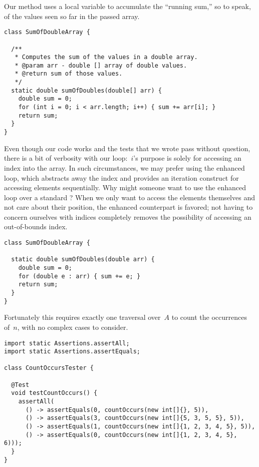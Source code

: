 Our method uses a local variable to accumulate the ``running sum,'' so to speak, of the values seen so far in the passed array.

\begin{lstlisting}[language=MyJava]
class SumOfDoubleArray {

  /**
   * Computes the sum of the values in a double array.
   * @param arr - double [] array of double values.
   * @return sum of those values.
   */
  static double sumOfDoubles(double[] arr) {
    double sum = 0;
    for (int i = 0; i < arr.length; i++) { sum += arr[i]; }
    return sum;
  }
}
\end{lstlisting}

Even though our code works and the tests that we wrote pass without question, there is a bit of verbosity with our loop:~$i$'s purpose is solely for accessing an index into the array. 
In such circumstances, we may prefer using the enhanced  loop, which abstracts away the index and provides an iteration construct for accessing elements sequentially.
Why might someone want to use the enhanced  loop over a standard ? 
When we only want to access the elements themselves and not care about their position, the enhanced counterpart is favored; not having to concern ourselves with indices completely removes the possibility of accessing an out-of-bounds index. 

\begin{lstlisting}[language=MyJava]
class SumOfDoubleArray {

  static double sumOfDoubles(double arr) {
    double sum = 0;
    for (double e : arr) { sum += e; }
    return sum;
  }
}
\end{lstlisting}

Fortunately this requires exactly one traversal over~$A$ to count the occurrences of~$n$, with no complex cases to consider.

\begin{lstlisting}[language=MyJava]
import static Assertions.assertAll;
import static Assertions.assertEquals;

class CountOccursTester {

  @Test
  void testCountOccurs() {
    assertAll(
      () -> assertEquals(0, countOccurs(new int[]{}, 5)),
      () -> assertEquals(3, countOccurs(new int[]{5, 3, 5, 5}, 5)),
      () -> assertEquals(1, countOccurs(new int[]{1, 2, 3, 4, 5}, 5)),
      () -> assertEquals(0, countOccurs(new int[]{1, 2, 3, 4, 5}, 6)));
  }
}
\end{lstlisting}

